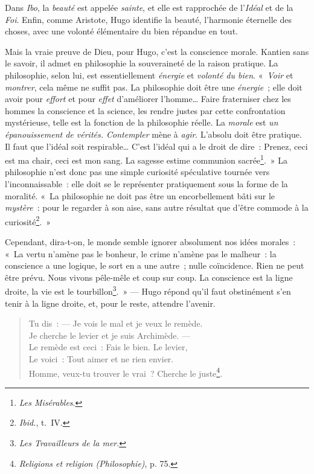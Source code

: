\documentclass[french,twoside]{book} %
\begin{document}
\noindent Dans \emph{Ibo}, la \emph{beauté} est appelée \emph{sainte}, et elle est rapprochée de l’\emph{Idéal} et de la \emph{Foi}. Enfin, comme Aristote, Hugo identifie la beauté, l’harmonie éternelle des choses, avec une volonté élémentaire du bien répandue en tout.\par
Mais la vraie preuve de Dieu, pour Hugo, c’est la conscience morale. Kantien sans le savoir, il admet en philosophie la souveraineté de la raison pratique. La philosophie, selon lui, est essentiellement \emph{énergie} et \emph{volonté du bien}. « \emph{Voir} et \emph{montrer}, cela même ne suffit pas. La philosophie doit être une \emph{énergie} ; elle doit avoir pour \emph{effort} et pour \emph{effet} d’améliorer l’homme… Faire fraterniser chez les hommes la conscience et la science, les rendre justes par cette confrontation mystérieuse, telle est la fonction de la philosophie réelle. La \emph{morale} est \emph{un épanouissement de vérités. Contempler} mène à \emph{agir}. L’absolu doit être pratique. Il faut que l’idéal soit respirable… C’est l’idéal qui a le droit de dire : Prenez, ceci est ma chair, ceci est mon sang. La sagesse estime communion sacrée\footnote{\emph{Les Misérables}.}. » La philosophie n’est donc pas une simple curiosité spéculative tournée vers l’inconnaissable : elle doit se le représenter pratiquement sous la forme de la moralité. « La philosophie ne doit pas être un encorbellement bâti sur le \emph{mystère} : pour le regarder à son aise, sans autre résultat que d’être commode à la curiosité\footnote{\emph{Ibid.}, t. IV.}. »\par
Cependant, dira-t-on, le monde semble ignorer absolument nos idées morales : « La vertu n’amène pas le bonheur, le crime n’amène pas le malheur : la conscience a une logique, le sort en a une autre ; nulle coïncidence. Rien ne peut être prévu. Nous vivons pêle-mêle et coup sur coup. La conscience est la ligne droite, la vie est le tourbillon\footnote{\emph{Les Travailleurs de la mer}.}. » — Hugo répond qu’il faut obstinément s’en tenir à la ligne droite, et, pour le reste, attendre l’avenir.\par


\begin{verse}
Tu dis : — Je vois le mal et je veux le remède.\\
Je cherche le levier et je suis Archimède. —\\
Le remède est ceci : Fais le bien. Le levier,\\
Le voici : Tout aimer et ne rien envier.\\
Homme, veux-tu trouver le vrai ? Cherche le juste\footnote{\emph{Religions et religion (Philosophie)}, p. 75.}.\\
\end{verse}
\end{document}
